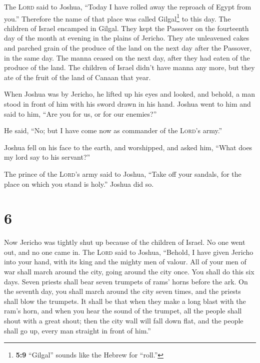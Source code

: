 The \textsc{Lord} said to Joshua, ``Today I have rolled
away the reproach of Egypt from you.'' Therefore the name of that place
was called Gilgal\footnote{\textbf{5:9} ``Gilgal'' sounds like the
  Hebrew for ``roll.''} to this day.  The children of
Israel encamped in Gilgal. They kept the Passover on the fourteenth day
of the month at evening in the plains of Jericho.  They
ate unleavened cakes and parched grain of the produce of the land on the
next day after the Passover, in the same day.  The manna
ceased on the next day, after they had eaten of the produce of the land.
The children of Israel didn't have manna any more, but they ate of the
fruit of the land of Canaan that year.

 When Joshua was by Jericho, he lifted up his eyes and
looked, and behold, a man stood in front of him with his sword drawn in
his hand. Joshua went to him and said to him, ``Are you for us, or for
our enemies?''

 He said, ``No; but I have come now as commander of the
\textsc{Lord}'s army.''

Joshua fell on his face to the earth, and worshipped, and asked him,
``What does my lord say to his servant?''

 The prince of the \textsc{Lord}'s army said to Joshua,
``Take off your sandals, for the place on which you stand is holy.''
Joshua did so.

\hypertarget{section-5}{%
\section{6}\label{section-5}}

 Now Jericho was tightly shut up because of the children
of Israel. No one went out, and no one came in.  The
\textsc{Lord} said to Joshua, ``Behold, I have given Jericho into your
hand, with its king and the mighty men of valour.  All of
your men of war shall march around the city, going around the city once.
You shall do this six days.  Seven priests shall bear
seven trumpets of rams' horns before the ark. On the seventh day, you
shall march around the city seven times, and the priests shall blow the
trumpets.  It shall be that when they make a long blast
with the ram's horn, and when you hear the sound of the trumpet, all the
people shall shout with a great shout; then the city wall will fall down
flat, and the people shall go up, every man straight in front of him.''

